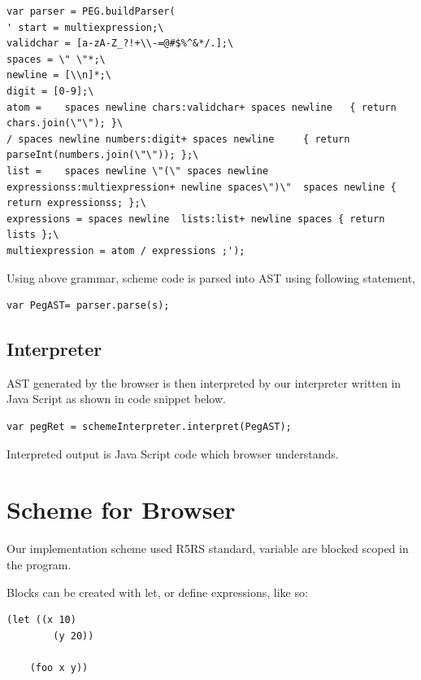 \begin{lstlisting}[frame=single]  
var parser = PEG.buildParser(
' start = multiexpression;\
validchar = [a-zA-Z_?!+\\-=@#$%^&*/.];\
spaces = \" \"*;\
newline = [\\n]*;\
digit = [0-9];\
atom =    spaces newline chars:validchar+ spaces newline   { return chars.join(\"\"); }\
/ spaces newline numbers:digit+ spaces newline     { return parseInt(numbers.join(\"\")); };\
list =    spaces newline \"(\" spaces newline expressionss:multiexpression+ newline spaces\")\"  spaces newline { return expressionss; };\
expressions = spaces newline  lists:list+ newline spaces { return lists };\
multiexpression = atom / expressions ;');
\end{lstlisting}

Using above grammar, scheme code is parsed into AST using following statement,

\begin{lstlisting}[frame=single]  
 var PegAST= parser.parse(s);
\end{lstlisting}


\subsection{Interpreter}

AST generated by the browser is then interpreted by our interpreter written in Java Script as shown in code snippet below.

\begin{lstlisting}[frame=single]  
var pegRet = schemeInterpreter.interpret(PegAST);
\end{lstlisting}

Interpreted output is Java Script code which browser understands.

\section{Scheme for Browser} 

Our implementation scheme used R5RS standard, variable are  blocked scoped in the program. 

Blocks can be created with let, or define expressions, like so:


\begin{lstlisting}[frame=single]  
	(let ((x 10)
		(y 20))
	
	(foo x y))
\end{lstlisting}



